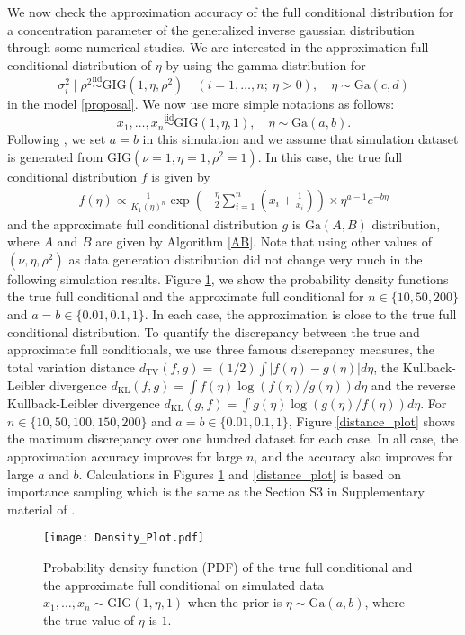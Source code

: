 \documentclass[11pt]{article}
\theoremstyle{plain}
\theoremstyle{definition}
\begin{document}
We now check the approximation accuracy of the full conditional distribution for a concentration parameter of the generalized inverse gaussian distribution through some numerical studies. We are interested in the approximation full conditional distribution of $\eta$ by using the gamma distribution for 
\[\sigma_i^2 \mid \rho^2  \overset{\mathrm{iid}}{\sim} \mathrm{GIG}(1,\eta,\rho^2)\quad (i=1,\dots,n; \  \eta>0),\quad \eta\sim \mathrm{Ga}(c,d)\]
in the model \eqref{proposal}. We now use more simple notations as follows:
\[x_1,\dots,x_n \overset{\mathrm{iid}}{\sim} \mathrm{GIG}(1,\eta,1),\quad \eta\sim \mathrm{Ga}(a,b).\]
Following \cite{M19}, we set $a=b$ in this simulation and we assume that simulation dataset is generated from $\mathrm{GIG}(\nu=1,\eta=1,\rho^2=1)$. In this case, the true full conditional distribution $f$ is given by
\begin{align*}
f(\eta)\propto \frac{1}{K_1(\eta)^n} \exp \left(-\frac{\eta}{2}\sum_{i=1}^n \left(x_i+\frac{1}{x_i}\right)\right)\times \eta^{a-1}e^{-b\eta}
\end{align*}
and the approximate full conditional distribution $g$ is $\mathrm{Ga}(A,B)$ distribution, where $A$ and $B$ are given by Algorithm \eqref{AB}. Note that using other values of $(\nu,\eta,\rho^2)$ as data generation distribution did not change very much in the following simulation results. Figure \ref{density_plot}, we show the probability density functions the true full conditional and the approximate full conditional for $n \in \{10,50,200\}$ and $a=b\in \{0.01,0.1,1\}$. In each case, the approximation is close to the true full conditional distribution. To quantify the discrepancy between the true and approximate full conditionals, we use three famous discrepancy measures, the total variation distance $d_{\mathrm{TV}}(f,g)=(1/2)\int |f(\eta) -g(\eta)| d\eta$, the Kullback-Leibler divergence $d_{\mathrm{KL}}(f,g)=\int f(\eta)\log(f(\eta)/g(\eta)) d\eta$ and the reverse Kullback-Leibler divergence $d_{\mathrm{KL}}(g,f)=\int g(\eta)\log(g(\eta)/f(\eta))d\eta$. For $n \in \{10,50,100,150,200\}$ and $a=b\in \{0.01,0.1,1\}$, Figure \ref{distance_plot} shows the maximum discrepancy over one hundred dataset for each case. In all case, the approximation accuracy improves for large $n$, and the accuracy also improves for large $a$ and $b$. Calculations in Figures \ref{density_plot} and \ref{distance_plot} is based on importance sampling which is the same as the Section S3 in Supplementary material of \cite{M19}.

\begin{figure}[htpb]
\centering
\texttt{[image: Density\_Plot.pdf]}
\caption{Probability density function (PDF) of the true full conditional and the approximate full conditional on simulated data $x_1,\dots,x_n \sim \mathrm{GIG}(1,\eta,1)$ when the prior is $\eta\sim \mathrm{Ga}(a,b)$, where the true value of $\eta$ is $1$.}
\label{density_plot}
\end{figure}
\end{document}
